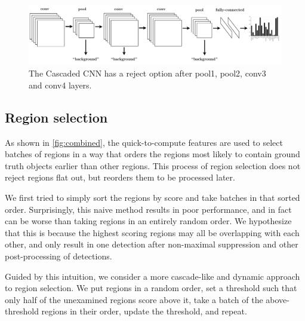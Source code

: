 \begin{figure}[h!]
\begin{center}
\includegraphics[width=0.98\columnwidth]{figures/ccnn.pdf}
\caption{
The Cascaded CNN has a reject option after pool1, pool2, conv3 and conv4 layers.
}\label{fig:ccnn}
\end{center}
\end{figure}

\subsection{Region selection}\label{sec:dynamic}

As shown in \autoref{fig:combined}, the quick-to-compute features are used to select batches of regions in a way that orders the regions most likely to contain ground truth objects earlier than other regions.
This process of region selection does not reject regions flat out, but reorders them to be processed later.

We first tried to simply sort the regions by score and take batches in that sorted order.
Surprisingly, this naive method results in poor performance, and in fact can be worse than taking regions in an entirely random order.
We hypothesize that this is because the highest scoring regions may all be overlapping with each other, and only result in one detection after non-maximal suppression and other post-processing of detections.

Guided by this intuition, we consider a more cascade-like and dynamic approach to region selection.
We put regions in a random order, set a threshold such that only half of the unexamined regions score above it, take a batch of the above-threshold regions in their order, update the threshold, and repeat.
